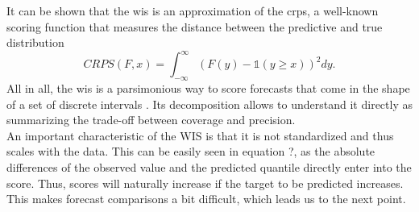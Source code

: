 It can be shown that the \ac{wis} is an approximation of the \ac{crps}, a well-known scoring function that measures the distance between the predictive and true distribution 
\begin{equation}
CRPS(F, x) = \int_{-\infty}^{\infty} \left(F(y) - \mathbb{1}(y \geq x) \right)^2dy.
\end{equation}
All in all, the \ac{wis} is a parsimonious way to score forecasts that come in the shape of a set of discrete intervals \citep{sherratt_predictive_2022}. Its decomposition allows to understand it directly as summarizing the trade-off between coverage and precision. \\
An important characteristic of the WIS is that it is not standardized and thus scales with the data. This can be easily seen in equation ?, as the absolute differences of the observed value and the predicted quantile directly enter into the score. Thus, scores will naturally increase if the target to be predicted increases. This makes forecast comparisons a bit difficult, which leads us to the next point.
